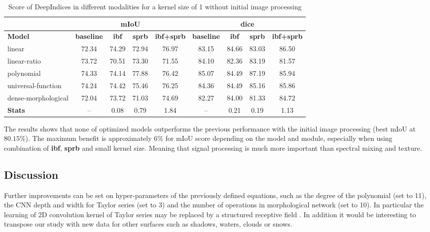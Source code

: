\documentclass[../thesis.tex]{subfiles}
\begin{document}
	\begin{table}[H]
		\centering
		\small
		\begin{tabular} {|l| |c|c|c|c||c|c|c|c|}
			\hline & \multicolumn{4}{c||}{\textbf{mIoU}} & \multicolumn{4}{|c|}{\textbf{dice}} \\
			\hline \textbf{Model} & \textbf{baseline} &	\textbf{ibf} &	\textbf{sprb} &	\textbf{ibf+sprb}  &	\textbf{baseline}  &	\textbf{ibf} &	\textbf{sprb} &	\textbf{ibf+sprb}  \\ \hline
			linear &     72.34 &  74.29 &  72.94 &     76.97 &  83.15 &  84.66 &  83.03 &     86.50 \\
			linear-ratio &     73.72 &  70.51 &  73.30 &     71.55 &  84.10 &  82.36 &  83.19 &     81.57 \\
			polynomial &     74.33 &  74.14 &  77.88 &     76.42 &  85.07 &  84.49 &  87.19 &     85.94 \\
			universal-function &     74.24 &  74.42 &  75.46 &     76.25 &  84.36 &  84.49 &  85.16 &     85.86 \\
			dense-morphological &     72.04 &  73.72 &  71.03 &     74.69 &  82.27 &  84.00 &  81.33 &     84.72 \\ \hline
			\textbf{Stats} &       --  &   0.08 &   0.79 &      1.84 &    --  &   0.21 &   0.19 &      1.13 \\
			\hline
		\end{tabular}
		
		\caption{Score of DeepIndices in different modalities for a kernel size of 1 without initial image processing}
		\label{tab:generic-score-1-without}
	\end{table}
	
	The results shows that none of optimized models outperforms the previous performance with the initial image processing (best mIoU at $80.15\%$). The maximum benefit is approximately $6\%$ for mIoU score depending on the model and module, especially when using combination of \textbf{ibf}, \textbf{sprb} and small kernel size. Meaning that signal processing is much more important than spectral mixing and texture.
	
	\subsection{Discussion}
	\label{sec:discussion}
	
	Further improvements can be set on hyper-parameters of the previously defined equations, such as the degree of the polynomial (set to 11), the CNN depth and width for Taylor series (set to 3) and the number of operations in morphological network (set to 10). In particular the learning of 2D convolution kernel of Taylor series may be replaced by a structured receptive field \cite{ReceptiveField}. In addition it would be interesting to transpose our study with new data for other surfaces such as shadows, waters, clouds or snows.
	
\end{document}
